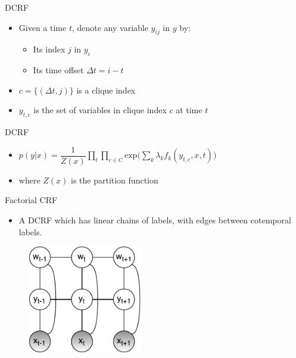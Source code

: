 \documentclass[presentation,bigger]{beamer}
\begin{document}
\begin{frame}[label={sec:orgheadline13}]{DCRF}
\begin{definition}
\begin{itemize}
\item Given a time \(t\), denote any variable \(y_{ij}\) in \(y\) by:
\begin{itemize}
\item Its index \(j\) in \(y_i\)
\item Its time offset \(\Delta t = i-t\)
\end{itemize}
\item \(c = \{(\Delta t, j)\}\) is a clique index
\item \(y_{t,c}\) is the set of variables in clique index \(c\) at time \(t\)
\end{itemize}
\end{definition}
\end{frame}
\begin{frame}[label={sec:orgheadline14}]{DCRF}
\begin{definition}
\begin{itemize}
\item \(p(y|x) = \dfrac{1}{Z(x)}\displaystyle \prod_{t}\prod_{c \in C} \text{exp}\Bigg(\sum_k \lambda_k f_k(y_{t,c},x,t)\Bigg)\)
\item where \(Z(x)\) is the partition function
\end{itemize}
\end{definition}
\end{frame}
\begin{frame}[label={sec:orgheadline15}]{Factorial CRF}
\begin{itemize}
\item A DCRF which has linear chains of labels, with edges between cotemporal labels.
\end{itemize}
\begin{figure}[htb]
\centering
\includegraphics[width=5cm]{figures/FCRF.pdf}
\end{figure}
\end{frame}
\end{document}
